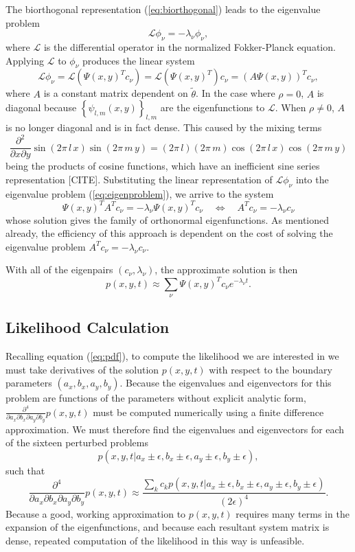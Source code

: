 \documentclass[10pt]{article}
\begin{document}
The biorthogonal representation (\ref{eq:biorthogonal}) leads to the
eigenvalue problem
\begin{equation}
  \mathcal{L} \phi_\nu = -\lambda_\nu \phi_\nu, \label{eq:eigenproblem}
\end{equation}
where $\mathcal{L}$ is the differential operator in the normalized
Fokker-Planck equation. Applying $\mathcal{L}$ to $\phi_\nu$ produces
the linear system
\[
  \mathcal{L}\phi_\nu = \mathcal{L}(\Psi(x,y)^T c_\nu) =
  \mathcal{L}(\Psi(x,y)^T) c_\nu = (A \Psi(x,y))^T c_\nu,
\] 
where $A$ is a constant matrix dependent on $\tilde{\theta}$. In the
case where $\rho = 0$, $A$ is diagonal because
$\left\{ \psi_{l,m}(x,y) \right\}_{l,m}$ are the eigenfunctions to
$\mathcal{L}$. When $\rho \neq 0$, $A$ is no longer diagonal and is in
fact dense. This caused by the mixing terms
\[
  \frac{\partial^2}{\partial x \partial y} \sin\left(2\pi\, l\,
    x\right) \sin\left(2\pi\, m\, y\right) = (2\pi\, l)(2\pi\, m)
  \cos\left(2\pi\, l\, x\right) \cos\left(2\pi\, m\, y\right)
\]
being the products of cosine functions, which have an inefficient sine
series representation [CITE]. Substituting the linear representation
of $\mathcal{L}\phi_\nu$ into the eigenvalue problem
(\ref{eq:eigenproblem}), we arrive to the system
\[
  \Psi(x,y)^T A^T c_\nu = -\lambda_\nu \Psi(x,y)^T c_\nu
  \quad \Leftrightarrow \quad A^T c_\nu = -\lambda_\nu c_\nu
\]
whose solution gives the family of orthonormal eigenfunctions. As
mentioned already, the efficiency of this approach is dependent on the
cost of solving the eigenvalue problem
$A^T c_\nu = -\lambda_\nu c_\nu$.

With all of the eigenpairs $(c_\nu, \lambda_\nu)$, the approximate solution is then
\[
  p(x,y,t) \approx \sum_{\nu}\Psi(x,y)^T c_\nu e^{-\lambda_\nu t}.
\]

\subsection{Likelihood Calculation} \label{sec:likelihood-calc}
Recalling equation (\ref{eq:pdf}), to compute the likelihood we are
interested in we must take derivatives of the solution $p(x,y,t)$ with
respect to the boundary parameters $(a_x, b_x, a_y, b_y)$. Because the
eigenvalues and eigenvectors for this problem are functions of the
parameters without explicit analytic form,
$\frac{\partial^4}{\partial a_x\partial b_x \partial a_y \partial
  b_y}p(x,y,t)$ must be computed numerically using a finite difference
approximation. We must therefore find the eigenvalues and
eigenvectors for each of the sixteen perturbed problems
\[
  p(x,y,t | a_x \pm \epsilon, b_x \pm \epsilon, a_y \pm \epsilon, b_y \pm \epsilon),
\]
such that
\[
  \frac{\partial^4}{\partial a_x\partial b_x \partial a_y \partial
    b_y}p(x,y,t) \approx \frac{\sum_{k} c_k p(x,y,t | a_x \pm \epsilon, b_x \pm \epsilon, a_y \pm \epsilon, b_y \pm \epsilon)}{(2\epsilon)^4}.
\]
Because a good, working approximation to $p(x,y,t)$ requires many
terms in the expansion of the eigenfunctions, and because each
resultant system matrix is dense, repeated computation of the
likelihood in this way is unfeasible.
\end{document}

